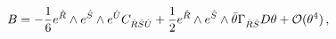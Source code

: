 \begin{equation}
B = -\frac{1}{6} e^{\hat{R}}\wedge e^{\hat{S}}\wedge e^{\hat{U}}C_{\hat{R}\hat{S}\hat{U}} + \frac{1}{2}e^{\hat{R}}\wedge e^{\hat{S}}\wedge
\bar{\theta} \Gamma_{\hat{R}\hat{S}}D\theta + {\cal O}(\theta^4)\,, \label{Bform}
\end{equation}

